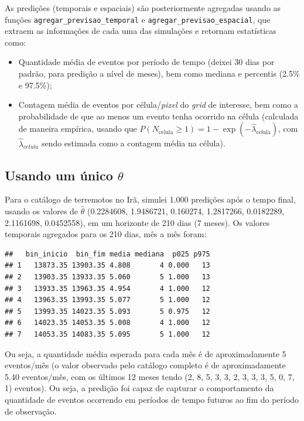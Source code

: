 \documentclass[11pt,]{article}
\providecommand{\tightlist}{%
\setlength{\itemsep}{0pt}\setlength{\parskip}{0pt}}
\begin{document}
As predições (temporais e espaciais) são posteriormente agregadas usando
as funções \texttt{agregar_previsao_temporal} e
\texttt{agregar_previsao_espacial}, que extraem as informações de cada
uma das simulações e retornam estatísticas como:

\begin{itemize}
\tightlist
\item
  Quantidade média de eventos por período de tempo (deixei 30 dias por
  padrão, para predição a nível de meses), bem como mediana e percentis
  (2.5\% e 97.5\%);
\item
  Contagem média de eventos por célula/\emph{pixel} do \emph{grid} de
  interesse, bem como a probabilidade de que ao menos um evento tenha
  ocorrido na célula (calculada de maneira empírica, usando que
  \(P(N_{\mathrm{celula}} \ge 1) = 1 - \exp(-\hat{\lambda}_{\mathrm{celula}})\),
  com \(\hat{\lambda}_{celula}\) sendo estimada como a contagem média na
  célula).
\end{itemize}

\hypertarget{usando-um-uxfanico-theta}{%
\subsection{\texorpdfstring{Usando um único
\(\theta\)}{Usando um único \textbackslash theta}}\label{usando-um-uxfanico-theta}}

Para o catálogo de terremotos no Irã, simulei 1.000 predições após o
tempo final, usando os valores de \(\hat{\theta}\) (0.2284608,
1.9486721, 0.160274, 1.2817266, 0.0182289, 2.1161698, 0.0452558), em um
horizonte de 210 dias (7 meses). Os valores temporais agregados para os
210 dias, mês a mês foram:

\begin{verbatim}
##   bin_inicio  bin_fim media mediana  p025 p975
## 1   13873.35 13903.35 4.808       4 0.000   13
## 2   13903.35 13933.35 5.060       5 1.000   13
## 3   13933.35 13963.35 4.954       4 1.000   12
## 4   13963.35 13993.35 5.077       5 1.000   12
## 5   13993.35 14023.35 5.093       5 0.975   12
## 6   14023.35 14053.35 5.008       4 1.000   12
## 7   14053.35 14083.35 5.095       5 1.000   12
\end{verbatim}

Ou seja, a quantidade média esperada para cada mês é de aproximadamente
5 eventos/mês (o valor observado pelo catálogo completo é de
aproximadamente 5.40 eventos/mês, com os últimos 12 meses tendo (2, 8,
5, 3, 3, 2, 3, 3, 3, 5, 0, 7, 1) eventos). Ou seja, a predição foi capaz
de capturar o comportamento da quantidade de eventos ocorrendo em
períodos de tempo futuros ao fim do período de observação.
\end{document}
